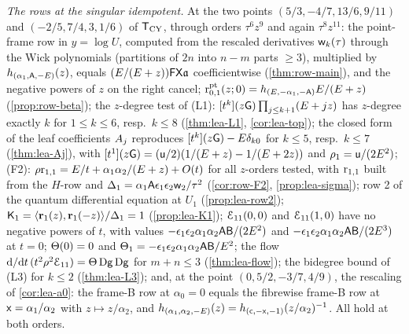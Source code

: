\emph{The rows at the singular idempotent.} At the two points $(5/3,-4/7,13/6,9/11)$ and $(-2/5,7/4,3,1/6)$ of $\mathsf{T}_{\mathrm{CY}}$, through orders $\tau^6z^9$ and again $\tau^8z^{11}$: the point-frame row in $y=\log U$, computed from the rescaled derivatives $\mathsf{w}_k(\tau)$ through the Wick polynomials (partitions of $2n$ into $n-m$ parts $\geq 3$), multiplied by $h_{(\alpha_1,\mathsf{A},-E)}(z)$, equals $(E/(E+z))\mathsf{F}\mathsf{X}\mathfrak{a}$ coefficientwise (\cref{thm:row-main}), and the negative powers of $z$ on the right cancel; $\mathrm{r}^{\mathrm{pt}}_{0,1}(z;0)=h_{(E,-\alpha_1,-\mathsf{A})}E/(E+z)$ (\cref{prop:row-beta}); the $z$-degree test of (L1): $[t^k](z\mathsf{G})\prod_{j\leq k+1}(E+jz)$ has $z$-degree exactly $k$ for $1\leq k\leq 6$, resp.\ $k\leq 8$ (\cref{thm:lea-L1}, \cref{cor:lea-top}); the closed form of the leaf coefficients $A_j$ reproduces $[t^k](z\mathsf{G})-E\delta_{k0}$ for $k\leq 5$, resp.\ $k\leq 7$ (\cref{thm:lea-Aj}), with $[t^1](z\mathsf{G})=(\mathsf{u}/2)(1/(E+z)-1/(E+2z))$ and $\rho_1=\mathsf{u}/(2E^2)$; (F2): $\rho\mathrm{r}_{1,1}=E/t+\alpha_1\alpha_2/(E+z)+O(t)$ for all $z$-orders tested, with $\mathrm{r}_{1,1}$ built from the $H$-row and $\Delta_1=\alpha_1\mathsf{A}\epsilon_1\epsilon_2\mathsf{w}_2/\tau^2$ (\cref{cor:row-F2}, \cref{prop:lea-sigma}); row 2 of the quantum differential equation at $U_1$ (\cref{prop:lea-row2}); $\mathsf{K}_{1}=\langle\mathbf{r}_1(z),\mathbf{r}_1(-z)\rangle/\Delta_1=1$ (\cref{prop:lea-K1}); $\mathcal{E}_{11}(0,0)$ and $\mathcal{E}_{11}(1,0)$ have no negative powers of $t$, with values $-\epsilon_1\epsilon_2\alpha_1\alpha_2\mathsf{A}\mathsf{B}/(2E^2)$ and $-\epsilon_1\epsilon_2\alpha_1\alpha_2\mathsf{A}\mathsf{B}/(2E^3)$ at $t=0$; $\Theta(0)=0$ and $\Theta_1=-\epsilon_1\epsilon_2\alpha_1\alpha_2\mathsf{A}\mathsf{B}/E^2$; the flow $\mathrm{d}/\mathrm{d} t\,(t^2\rho^2\mathcal{E}_{11})=\Theta\,\mathrm{D}\mathsf{g}\,\mathrm{D}\mathsf{g}$ for $m+n\leq 3$ (\cref{thm:lea-flow}); the bidegree bound of (L3) for $k\leq 2$ (\cref{thm:lea-L3}); and, at the point $(0,5/2,-3/7,4/9)$, the rescaling of \cref{cor:lea-a0}: the frame-B row at $\alpha_0=0$ equals the fibrewise frame-B row at $\mathsf{x}=\alpha_1/\alpha_2$ with $z\mapsto z/\alpha_2$, and $h_{(\alpha_1,\alpha_2,-E)}(z)=h_{(\mathsf{c},-\mathsf{x},-1)}(z/\alpha_2)^{-1}$. All hold at both orders.

